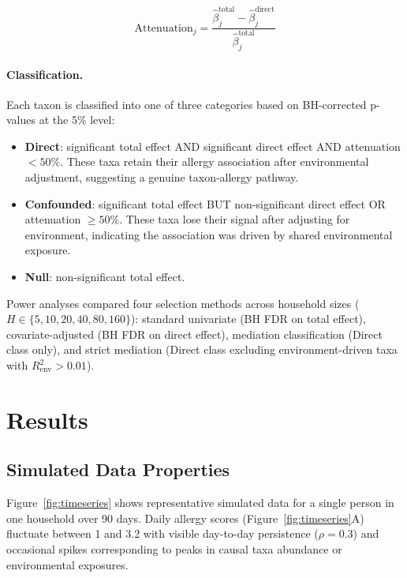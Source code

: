 \documentclass[11pt,letterpaper]{article}
\begin{document}
\begin{equation}
    \text{Attenuation}_j = \frac{\hat{\beta}_j^{\text{total}} - \hat{\beta}_j^{\text{direct}}}{\hat{\beta}_j^{\text{total}}}
\end{equation}

\paragraph{Classification.} Each taxon is classified into one of three categories based on BH-corrected p-values at the 5\% level:

\begin{itemize}
    \item \textbf{Direct}: significant total effect AND significant direct effect AND attenuation $< 50\%$. These taxa retain their allergy association after environmental adjustment, suggesting a genuine taxon-allergy pathway.
    \item \textbf{Confounded}: significant total effect BUT non-significant direct effect OR attenuation $\geq 50\%$. These taxa lose their signal after adjusting for environment, indicating the association was driven by shared environmental exposure.
    \item \textbf{Null}: non-significant total effect.
\end{itemize}

Power analyses compared four selection methods across household sizes ($H \in \{5, 10, 20, 40, 80, 160\}$): standard univariate (BH FDR on total effect), covariate-adjusted (BH FDR on direct effect), mediation classification (Direct class only), and strict mediation (Direct class excluding environment-driven taxa with $R^2_{\text{env}} > 0.01$).

\section{Results}

\subsection{Simulated Data Properties}

Figure~\ref{fig:timeseries} shows representative simulated data for a single person in one household over 90 days. Daily allergy scores (Figure~\ref{fig:timeseries}A) fluctuate between 1 and 3.2 with visible day-to-day persistence ($\rho = 0.3$) and occasional spikes corresponding to peaks in causal taxa abundance or environmental exposures.
\end{document}
